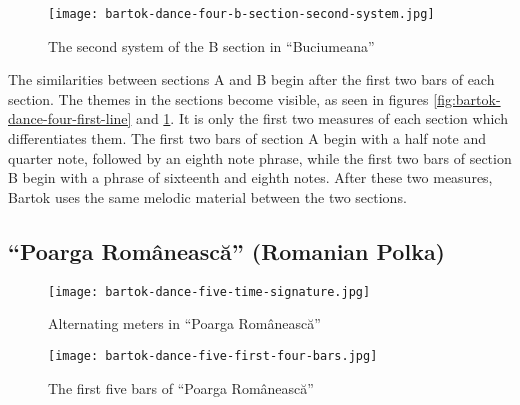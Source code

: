 \begin{figure}
  \centering
  \texttt{[image: bartok-dance-four-b-section-second-system.jpg]}
  \caption[The second system of ``Buciumeana'' in Bartok's \textit{Romanian Folk Dances, Sz. 56, BB 88}]{The second system of the B section in ``Buciumeana''}
  \label{fig:bartok-dance-four-b-section-second-system}
\end{figure}

The similarities between sections A and B begin after the first two bars of each section. The themes in the sections become visible, as seen in figures \ref{fig:bartok-dance-four-first-line}\autocite{Lung_2016} and \ref{fig:bartok-dance-four-b-section-second-system}\autocite{Lung_2016}. It is only the first two measures of each section which differentiates them. The first two bars of section A begin with a half note and quarter note, followed by an eighth note phrase, while the first two bars of section B begin with a phrase of sixteenth and eighth notes. After these two measures, Bartok uses the same melodic material between the two sections. 

\subsection{``Poarga Românească'' (Romanian Polka)}

\begin{figure}
  \centering
  \texttt{[image: bartok-dance-five-time-signature.jpg]}
  \caption[The alternating meters in ``Poarga Românească'' of Bartok's \textit{Romanian Folk Dances, Sz. 56, BB 68}]{Alternating meters in ``Poarga Românească''}
  \label{fig:bartok-dance-five-time-signature}
\end{figure}

\begin{figure}
  \centering
  \texttt{[image: bartok-dance-five-first-four-bars.jpg]}
  \caption[The first five bars of ``Poarga Românească'', of Bartok's \textit{Romanian Folk Dances, Sz. 56, BB 68}]{The first five bars of ``Poarga Românească''}
  \label{fig:bartok-dance-five-first-four-bars}
\end{figure}


